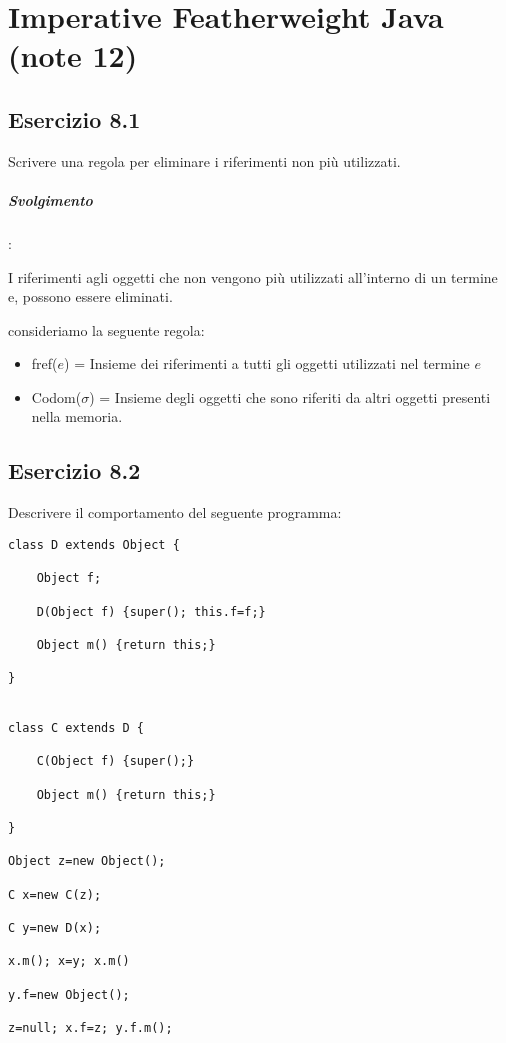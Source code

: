 \section{Imperative Featherweight Java (note 12)}
\vspace{1cm}

\subsection*{Esercizio 8.1}
Scrivere una regola per eliminare i riferimenti non pi\`u utilizzati.


\subparagraph{Svolgimento}:


I riferimenti agli oggetti che non vengono pi\`u utilizzati all'interno di un termine e, possono essere eliminati.

consideriamo la seguente regola:

\begin{prooftree}
	\end{prooftree}

\vspace{0,5cm}

\begin{itemize}
\item fref($e$) = Insieme dei riferimenti a tutti gli oggetti utilizzati nel termine $e$
\item Codom($\sigma$) = Insieme degli oggetti che sono riferiti da altri oggetti presenti nella memoria.
\end{itemize}

\vspace{1,5cm}



\subsection*{Esercizio 8.2}
Descrivere il comportamento del seguente programma:
 
\begin{lstlisting}
class D extends Object {

	Object f; 
	
	D(Object f) {super(); this.f=f;}
 
	Object m() {return this;}
	
}


class C extends D {

	C(Object f) {super();}
 
	Object m() {return this;}

}

Object z=new Object();

C x=new C(z);

C y=new D(x);

x.m(); x=y; x.m()

y.f=new Object();

z=null; x.f=z; y.f.m();

\end{lstlisting}

